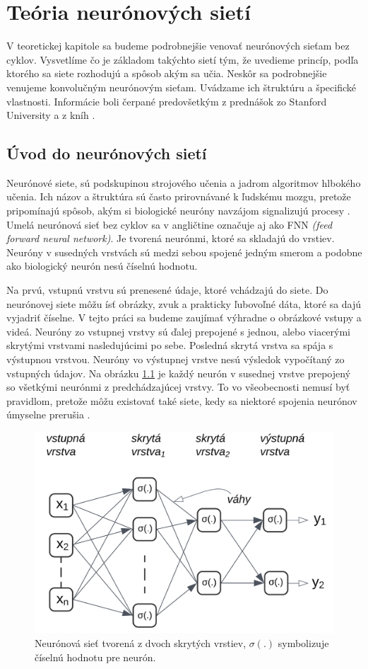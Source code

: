 \chapter{Teória neurónových sietí}\label{chap:theory}

V teoretickej kapitole sa budeme podrobnejšie venovať neurónových sieťam bez cyklov. Vysvetlíme čo je základom takýchto sietí tým, že uvedieme princíp, podľa ktorého sa siete rozhodujú a spôsob akým sa učia. Neskôr sa podrobnejšie venujeme konvolučným neurónovým sieťam. Uvádzame ich štruktúru a špecifické vlastnosti. Informácie boli čerpané predovšetkým z prednášok zo Stanford University \cite{SF} a z kníh \cite{RosinPaulL2019RIAa, Goodfellow-et-al-2016}. 

\section{Úvod do neurónových sietí}

Neurónové siete, sú podskupinou strojového učenia a jadrom algoritmov hlbokého učenia. Ich názov a štruktúra sú často prirovnávané k ľudskému mozgu, pretože pripomínajú spôsob, akým si biologické neuróny navzájom signalizujú procesy \cite{Shanmuganathan2016}. Umelá neurónová sieť bez cyklov sa v angličtine označuje aj ako FNN \textit{(feed forward neural network)}. Je tvorená neurónmi, ktoré sa skladajú do vrstiev. Neuróny v susedných vrstvách sú medzi sebou spojené jedným smerom a podobne ako biologický neurón nesú číselnú hodnotu.

Na prvú, vstupnú vrstvu sú prenesené údaje, ktoré vchádzajú do siete. Do neurónovej siete môžu ísť obrázky, zvuk a prakticky ľubovoľné dáta, ktoré sa dajú vyjadriť číselne. V tejto práci sa budeme zaujímať výhradne o obrázkové vstupy a videá. Neuróny zo vstupnej vrstvy sú ďalej prepojené s jednou, alebo viacerými skrytými vrstvami nasledujúcimi po sebe. Posledná skrytá vrstva sa spája s výstupnou vrstvou. Neuróny vo výstupnej vrstve nesú výsledok vypočítaný zo vstupných údajov. Na obrázku \ref{img:network} je každý neurón v susednej vrstve prepojený so všetkými neurónmi z predchádzajúcej vrstvy. To vo všeobecnosti nemusí byť pravidlom, pretože môžu existovať také siete, kedy sa niektoré spojenia neurónov úmyselne prerušia \cite{DettmersTim2019SNfS}.
\begin{figure}[ht]
    \centering
    \includegraphics[width=.6\textwidth]{images/02/mynn.png}
    \caption{Neurónová sieť tvorená z dvoch skrytých vrstiev, \begin{math}\sigma(.)\end{math} symbolizuje číselnú hodnotu pre neurón. }
    \label{img:network}
\end{figure}


